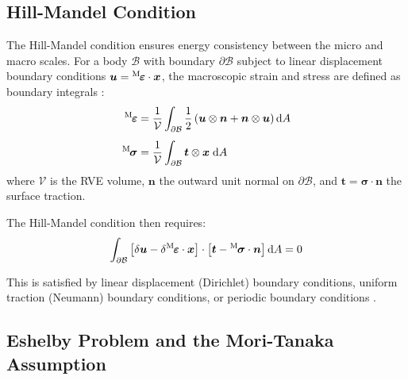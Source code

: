 \documentclass[oneside, 12pt, a4paper, bibliography=totoc]{book}
\newcommand{\bs}[1]{\bm{#1}}                       %
\newcommand{\dd}{\mathrm{d}}                       %
\begin{document}
\subsection{Hill-Mandel Condition}
\label{subsec:hill_mandel}

The Hill-Mandel condition ensures energy consistency between the micro and macro scales. For a body $\mathcal{B}$ with boundary $\partial\mathcal{B}$ subject to linear displacement boundary conditions $\bs{u} = {}^{\mathrm{M}}\hspace{-1pt}\bs{\varepsilon} \cdot \bs{x}$, the macroscopic strain and stress are defined as boundary integrals \cite{Firooz2022}:
%
\begin{align}
    {}^{\mathrm{M}}\hspace{-1pt}\bs{\varepsilon} &= \frac{1}{\mathcal{V}} \int_{\partial\mathcal{B}} \frac{1}{2} \left(\bs{u} \otimes \bs{n} + \bs{n} \otimes \bs{u}\right) \dd A \label{eq:macro_strain_boundary}\\[4pt]
    {}^{\mathrm{M}}\hspace{-1pt}\bs{\sigma} &= \frac{1}{\mathcal{V}} \int_{\partial\mathcal{B}} \bs{t} \otimes \bs{x} \;\dd A \label{eq:macro_stress_boundary}
\end{align}
%
where $\mathcal{V}$ is the RVE volume, $\bs{n}$ the outward unit normal on $\partial\mathcal{B}$, and $\bs{t} = \bs{\sigma} \cdot \bs{n}$ the surface traction.

The Hill-Mandel condition then requires:
%
\begin{equation}
    \int_{\partial\mathcal{B}} \left[\delta\bs{u} - \delta {}^{\mathrm{M}}\hspace{-1pt}\bs{\varepsilon} \cdot \bs{x}\right] \cdot \left[\bs{t} - {}^{\mathrm{M}}\hspace{-1pt}\bs{\sigma} \cdot \bs{n}\right] \dd A = 0
    \label{eq:hill_mandel}
\end{equation}

This is satisfied by linear displacement (Dirichlet) boundary conditions, uniform traction (Neumann) boundary conditions, or periodic boundary conditions \cite{Hill1963}.

\subsection{Eshelby Problem and the Mori-Tanaka Assumption}
\label{subsec:eshelby_problem}
\end{document}

